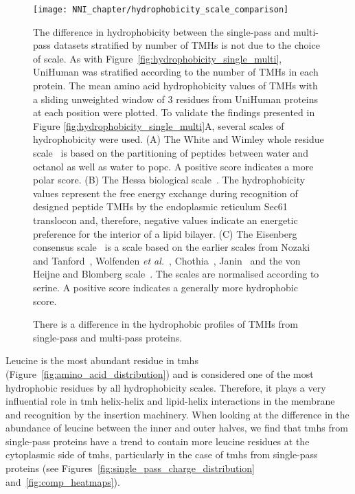 \begin{figure}[!ht]
\centering
\texttt{[image: NNI\_chapter/hydrophobicity\_scale\_comparison]}
\caption{There is a difference in the hydrophobic profiles of TMHs from single-pass and multi-pass proteins.}
\medskip
\justify
\small
The difference in hydrophobicity between the single-pass and multi-pass datasets stratified by number of TMHs is not due to the choice of scale. As with Figure~\ref{fig:hydrophobicity_single_multi}, UniHuman was stratified according to the number of TMHs in each protein. The mean amino acid hydrophobicity values of TMHs with a sliding unweighted window of 3 residues from UniHuman proteins at each position were plotted. To validate the findings presented in Figure \ref{fig:hydrophobicity_single_multi}A, several scales of hydrophobicity were used. (A) The White and Wimley whole residue scale~\cite{White1999} is based on the partitioning of peptides between water and octanol as well as water to \gls{popc}. A positive score indicates a more polar score. (B) The Hessa biological scale~\cite{Hessa2005}. The hydrophobicity values represent the free energy exchange during recognition of designed peptide TMHs by the endoplasmic reticulum Sec61 translocon and, therefore, negative values indicate an energetic preference for the interior of a lipid bilayer. (C) The Eisenberg consensus scale~\cite{Eisenberg1984} is a scale based on the earlier scales from Nozaki and Tanford~\cite{Nozaki1971}, Wolfenden \textit{et al.}~\cite{Wolfenden1981}, Chothia~\cite{Chothia1976}, Janin~\cite{Janin1979} and the von Heijne and Blomberg scale~\cite{VonHeijne1979}. The scales are normalised according to serine. A positive score indicates a generally more hydrophobic score.
\label{fig:hydrophobicity_scale_comparison}
\end{figure}

Leucine is the most abundant residue in \gls{tmh}s (Figure~\ref{fig:amino_acid_distribution}) and is considered one of the most hydrophobic residues by all hydrophobicity scales. Therefore, it plays a very influential role in \gls{tmh} helix-helix and lipid-helix interactions in the membrane and recognition by the insertion machinery. When looking at the difference in the abundance of leucine between the inner and outer halves, we find that \gls{tmh}s from single-pass proteins have a trend to contain more leucine residues at the cytoplasmic side of \gls{tmh}s, particularly in the case of \gls{tmh}s from single-pass proteins (see Figures~\ref{fig:single_pass_charge_distribution} and~\ref{fig:comp_heatmaps}).

